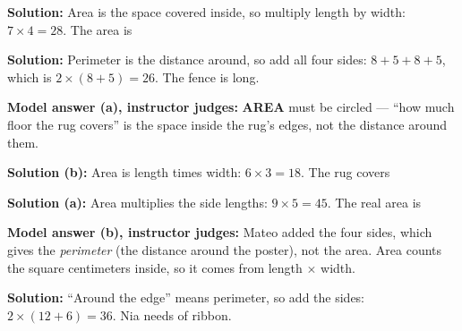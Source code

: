\documentclass[12pt]{article}
\begin{document}



\textbf{Solution:} Area is the space covered inside, so multiply length by
width: $7 \times 4 = 28$. The area is 


\textbf{Solution:} Perimeter is the distance around, so add all four sides:
$8 + 5 + 8 + 5$, which is $2 \times (8 + 5) = 26$. The fence is
 long.


\textbf{Model answer (a), instructor judges:} \textbf{AREA} must be circled ---
``how much floor the rug covers'' is the space inside the rug's edges, not the
distance around them.

\textbf{Solution (b):} Area is length times width: $6 \times 3 = 18$. The rug
covers 


\textbf{Solution (a):} Area multiplies the side lengths: $9 \times 5 = 45$.
The real area is 

\textbf{Model answer (b), instructor judges:} Mateo added the four sides, which
gives the \emph{perimeter} (the distance around the poster), not the area.
Area counts the square centimeters inside, so it comes from
length $\times$ width.


\textbf{Solution:} ``Around the edge'' means perimeter, so add the sides:
$2 \times (12 + 6) = 36$. Nia needs  of ribbon.
\end{document}
